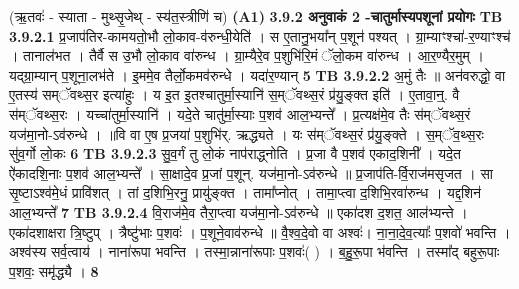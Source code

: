 \documentclass[17pt]{extarticle}
\begin{document}
{{{{{{{{{{{{{{{{{{{{{{                  \newline
                                    (ऋ॒तवः॑ - स्याता - मुथ्सृ॒जेथ् - स्य॑त॒स्त्रीणि॑ च) \textbf{(A1)} \newline \newline
                \textbf{ 3.9.2     अनुवाकं   2 -चातुर्मास्यपशूनां प्रयोगः} \newline
                                \textbf{ TB 3.9.2.1} \newline
                  प्र॒जाप॑तिर-कामयतो॒भौ लो॒काव-व॑रुन्धी॒येति॑ । स ए॒तानु॒भया᳚न् प॒शून॑ पश्यत् । ग्रा॒म्याꣳश्चा॑-र॒ण्याꣳश्च॑ । तानाल॑भत । तैर्वै स उ॒भौ लो॒काव वा॑रुन्ध । ग्रा॒म्यैरे॒व प॒शुभि॑रि॒मं ॅलो॒कम वा॑रुन्ध । आ॒र॒ण्यैर॒मुम् । यद्ग्रा॒म्यान् प॒शूना॒लभ॑ते । इ॒ममे॒व तैर्लो॒कमव॑रुन्धे । यदा॑र॒ण्यान् \textbf{ 5} \newline
                  \newline
                                \textbf{ TB 3.9.2.2} \newline
                  अ॒मुं तैः ॥ अन॑वरुद्धो॒ वा ए॒तस्य॑ सम्ॅवथ्स॒र इत्या॑हुः । य इ॒त इ॒तश्चातुर्मा॒स्यानि॑ स॒म्ॅवथ्स॒रं प्र॑यु॒ङ्क्त इति॑ । ए॒तावा॒न्॒. वै स॑म्ॅवथ्स॒रः । यच्चा॑तुर्मा॒स्यानि॑ । यदे॒ते चातु॑र्मा॒स्याः प॒शव॑ आल॒भ्यन्ते᳚ । प्र॒त्यक्ष॑मे॒व तैः स॑म्ॅवथ्स॒रं यज॑मा॒नो-ऽव॑रुन्धे । ॥वि वा ए॒ष प्र॒जया॑ प॒शुभि॑र्. ऋद्ध्यते । यः स॑म्ॅवथ्स॒रं प्र॑यु॒ङ्क्ते । स॒म्ॅव॒थ्स॒रः सु॑व॒र्गो लो॒कः \textbf{ 6} \newline
                  \newline
                                \textbf{ TB 3.9.2.3} \newline
                  सु॒व॒र्गं तु लो॒कं नाप॑राद्ध्नोति । प्र॒जा वै प॒शव॑ एकाद॒शिनी᳚ । यदे॒त ऐ॑कादशि॒नाः प॒शव॑ आल॒भ्यन्ते᳚ । सा॒क्षादे॒व प्र॒जां प॒शून्. यज॑मा॒नो-ऽव॑रुन्धे ॥ प्र॒जाप॑ति-र्वि॒राज॑मसृजत । सा सृ॒ष्टाऽश्व॑मे॒धं प्रावि॑शत् । तां द॒शिभि॒रनु॒ प्रायु॑ङ्क्त । तामा᳚प्नोत् । तामा॒प्त्वा द॒शिभि॒रवा॑रुन्ध । यद्द॒शिन॑ आल॒भ्यन्ते᳚ \textbf{ 7} \newline
                  \newline
                                \textbf{ TB 3.9.2.4} \newline
                  वि॒राज॑मे॒व तैरा॒प्त्वा यज॑मा॒नो-ऽव॑रुन्धे ॥ एका॑दश द॒शत॒ आल॑भ्यन्ते । एका॑दशाक्षरा त्रि॒ष्टुप् । त्रैष्टु॑भाः प॒शवः॑ । प॒शूने॒वाव॑रुन्धे ॥ वै॒श्व॒दे॒वो वा अश्वः॑। ना॒ना॒दे॒व॒त्याः᳚ प॒शवो॑ भवन्ति । अश्व॑स्य सर्व॒त्वाय॑ । नाना॑रूपा भवन्ति । तस्मा॒न्नाना॑रूपाः प॒शवः॑( ) । ब॒हु॒रू॒पा भ॑वन्ति । तस्मा᳚द् बहुरू॒पाः प॒शवः॒ समृ॑द्ध्यै । \textbf{ 8} \newline
}}}}}}}}}}}}}}}}}}}}}}
\end{document}
